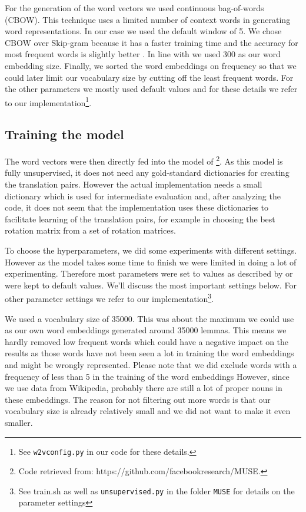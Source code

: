 \documentclass{article}
\begin{document}
For the generation of the word vectors we used continuous bag-of-words (CBOW). This technique uses a limited number of context words in generating word representations. In our case we used the default window of 5. We chose CBOW over Skip-gram because it has a faster training time and the accuracy for most frequent words is slightly better \citep{mikolov2013efficient}. In line with \citet{conneau2017word} we used 300 as our word embedding size. Finally, we sorted the word embeddings on frequency so that we could later limit our vocabulary size by cutting off the least frequent words. For the other parameters we mostly used default values and for these details we refer to our implementation\footnote{See \texttt{w2vconfig.py} in our code for these details.}.

\subsection{Training the model}
The word vectors were then directly fed into the model of \cite{conneau2017word}\footnote{Code retrieved from: https://github.com/facebookresearch/MUSE.}. As this model is fully unsupervised, it does not need any gold-standard dictionaries for creating the translation pairs. However the actual implementation needs a small dictionary which is used for intermediate evaluation and, after analyzing the code, it does not seem that the implementation uses these dictionaries to facilitate learning of the translation pairs, for example in choosing the best rotation matrix from a set of rotation matrices.

To choose the hyperparameters, we did some experiments with different settings. However as the model takes some time to finish we were limited in doing a lot of experimenting. Therefore most parameters were set to values as described by \citet{conneau2017word} or were kept to default values. We'll discuss the most important settings below. For other parameter settings we refer to our implementation\footnote{See train.sh as well as \texttt{unsupervised.py} in the folder \texttt{MUSE} for details on the parameter settings}.

We used a vocabulary size of 35000. This was about the maximum we could use as our own word embeddings generated around 35000 lemmas. This means we hardly removed low frequent words which could have a negative impact on the results as those words have not been seen a lot in training the word embeddings and might be wrongly represented. Please note that we did exclude words with a frequency of less than 5 in the training of the word embeddings However, since we use data from Wikipedia, probably there are still a lot of proper nouns in these embeddings. The reason for not filtering out more words is that our vocabulary size is already relatively small and we did not want to make it even smaller. 
\end{document}
